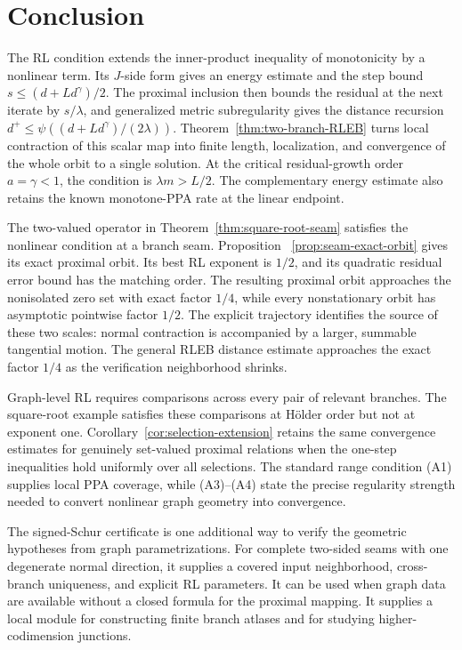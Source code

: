 \section{Conclusion}
\label{sec:conclusion}

The RL condition extends the inner-product inequality of monotonicity by a
nonlinear term.  Its $J$-side form gives an energy estimate and the step bound
$s\le(d+Ld^\gamma)/2$.  The proximal inclusion then bounds the residual at
the next iterate by $s/\lambda$, and generalized metric subregularity gives
the distance recursion
$d^+\le\psi((d+Ld^\gamma)/(2\lambda))$.
Theorem~\ref{thm:two-branch-RLEB} turns local contraction of this scalar map
into finite length, localization, and convergence of the whole orbit to a
single solution.  At the critical residual-growth order $a=\gamma<1$, the
condition is $\lambda m>L/2$.  The complementary energy estimate also retains the known
monotone-PPA rate at the linear endpoint.

The two-valued operator in Theorem~\ref{thm:square-root-seam} satisfies the
nonlinear condition at a branch seam.  Proposition~
\ref{prop:seam-exact-orbit} gives its exact proximal orbit.  Its best RL exponent is
$1/2$, and its quadratic residual error bound has the matching order.
The resulting proximal orbit approaches the nonisolated zero set with exact
factor $1/4$, while every nonstationary orbit has asymptotic pointwise factor
$1/2$.  The explicit trajectory identifies the source of these two scales:
normal contraction is accompanied by a larger, summable tangential motion.
The general RLEB distance estimate approaches the exact factor $1/4$ as the
verification neighborhood shrinks.

Graph-level RL requires comparisons across every pair of relevant branches.
The square-root example satisfies these comparisons at H\"older order but not
at exponent one.  Corollary~\ref{cor:selection-extension} retains the same
convergence estimates for genuinely set-valued proximal relations when the
one-step inequalities hold uniformly over all selections.  The standard
range condition (A1) supplies local PPA coverage, while (A3)--(A4) state the
precise regularity strength needed to convert nonlinear graph geometry into
convergence.

The signed-Schur certificate is one additional way to verify the geometric
hypotheses from graph parametrizations.  For complete two-sided seams with
one degenerate normal direction, it supplies a covered input neighborhood,
cross-branch uniqueness, and explicit RL parameters.  It can be used when
graph data are available without a closed formula for the proximal mapping.
It supplies a local module for constructing finite branch atlases and for
studying higher-codimension junctions.
